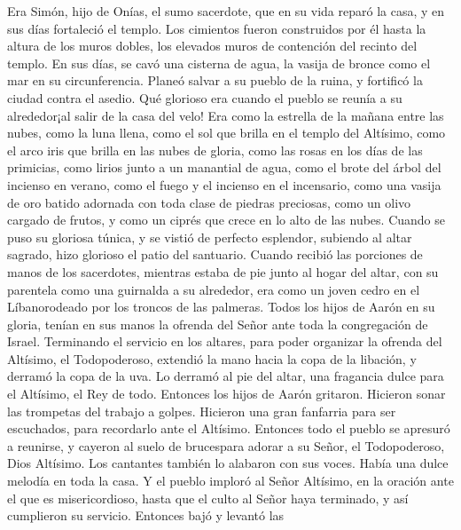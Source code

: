  Era Simón, hijo de Onías, el sumo sacerdote, que en su
vida reparó la casa, y en sus días fortaleció el templo. 
Los cimientos fueron construidos por él hasta la altura de los muros
dobles, los elevados muros de contención del recinto del templo.
 En sus días, se cavó una cisterna de agua, la vasija de
bronce como el mar en su circunferencia.  Planeó salvar a
su pueblo de la ruina, y fortificó la ciudad contra el asedio.
 Qué glorioso era cuando el pueblo se reunía a su
alrededor¡al salir de la casa del velo!  Era como la
estrella de la mañana entre las nubes, como la luna llena,
 como el sol que brilla en el templo del Altísimo, como el
arco iris que brilla en las nubes de gloria,  como las
rosas en los días de las primicias, como lirios junto a un manantial de
agua, como el brote del árbol del incienso en verano, 
como el fuego y el incienso en el incensario, como una vasija de oro
batido adornada con toda clase de piedras preciosas, 
como un olivo cargado de frutos, y como un ciprés que crece en lo alto
de las nubes.  Cuando se puso su gloriosa túnica, y se
vistió de perfecto esplendor, subiendo al altar sagrado, hizo glorioso
el patio del santuario.  Cuando recibió las porciones de
manos de los sacerdotes, mientras estaba de pie junto al hogar del
altar, con su parentela como una guirnalda a su alrededor, era como un
joven cedro en el Líbanorodeado por los troncos de las palmeras.
 Todos los hijos de Aarón en su gloria, tenían en sus
manos la ofrenda del Señor ante toda la congregación de Israel.
 Terminando el servicio en los altares, para poder
organizar la ofrenda del Altísimo, el Todopoderoso, 
extendió la mano hacia la copa de la libación, y derramó la copa de la
uva. Lo derramó al pie del altar, una fragancia dulce para el Altísimo,
el Rey de todo.  Entonces los hijos de Aarón gritaron.
Hicieron sonar las trompetas del trabajo a golpes. Hicieron una gran
fanfarria para ser escuchados, para recordarlo ante el Altísimo.
 Entonces todo el pueblo se apresuró a reunirse, y
cayeron al suelo de brucespara adorar a su Señor, el Todopoderoso, Dios
Altísimo.  Los cantantes también lo alabaron con sus
voces. Había una dulce melodía en toda la casa.  Y el
pueblo imploró al Señor Altísimo, en la oración ante el que es
misericordioso, hasta que el culto al Señor haya terminado, y así
cumplieron su servicio.  Entonces bajó y levantó las
